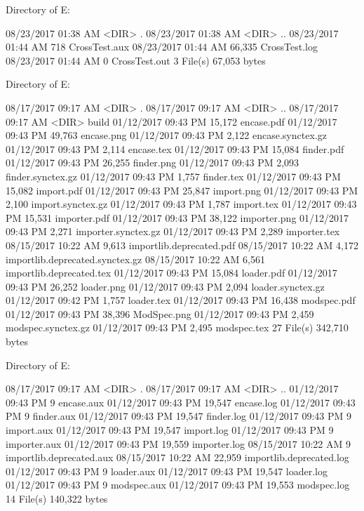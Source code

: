  Directory of E:\Python\apeman\docs\figures\build

08/23/2017  01:38 AM    <DIR>          .
08/23/2017  01:38 AM    <DIR>          ..
08/23/2017  01:44 AM               718 CrossTest.aux
08/23/2017  01:44 AM            66,335 CrossTest.log
08/23/2017  01:44 AM                 0 CrossTest.out
               3 File(s)         67,053 bytes

 Directory of E:\Python\apeman\docs\figures\structure

08/17/2017  09:17 AM    <DIR>          .
08/17/2017  09:17 AM    <DIR>          ..
08/17/2017  09:17 AM    <DIR>          build
01/12/2017  09:43 PM            15,172 encase.pdf
01/12/2017  09:43 PM            49,763 encase.png
01/12/2017  09:43 PM             2,122 encase.synctex.gz
01/12/2017  09:43 PM             2,114 encase.tex
01/12/2017  09:43 PM            15,084 finder.pdf
01/12/2017  09:43 PM            26,255 finder.png
01/12/2017  09:43 PM             2,093 finder.synctex.gz
01/12/2017  09:43 PM             1,757 finder.tex
01/12/2017  09:43 PM            15,082 import.pdf
01/12/2017  09:43 PM            25,847 import.png
01/12/2017  09:43 PM             2,100 import.synctex.gz
01/12/2017  09:43 PM             1,787 import.tex
01/12/2017  09:43 PM            15,531 importer.pdf
01/12/2017  09:43 PM            38,122 importer.png
01/12/2017  09:43 PM             2,271 importer.synctex.gz
01/12/2017  09:43 PM             2,289 importer.tex
08/15/2017  10:22 AM             9,613 importlib.deprecated.pdf
08/15/2017  10:22 AM             4,172 importlib.deprecated.synctex.gz
08/15/2017  10:22 AM             6,561 importlib.deprecated.tex
01/12/2017  09:43 PM            15,084 loader.pdf
01/12/2017  09:43 PM            26,252 loader.png
01/12/2017  09:43 PM             2,094 loader.synctex.gz
01/12/2017  09:42 PM             1,757 loader.tex
01/12/2017  09:43 PM            16,438 modspec.pdf
01/12/2017  09:43 PM            38,396 ModSpec.png
01/12/2017  09:43 PM             2,459 modspec.synctex.gz
01/12/2017  09:43 PM             2,495 modspec.tex
              27 File(s)        342,710 bytes

 Directory of E:\Python\apeman\docs\figures\structure\build

08/17/2017  09:17 AM    <DIR>          .
08/17/2017  09:17 AM    <DIR>          ..
01/12/2017  09:43 PM                 9 encase.aux
01/12/2017  09:43 PM            19,547 encase.log
01/12/2017  09:43 PM                 9 finder.aux
01/12/2017  09:43 PM            19,547 finder.log
01/12/2017  09:43 PM                 9 import.aux
01/12/2017  09:43 PM            19,547 import.log
01/12/2017  09:43 PM                 9 importer.aux
01/12/2017  09:43 PM            19,559 importer.log
08/15/2017  10:22 AM                 9 importlib.deprecated.aux
08/15/2017  10:22 AM            22,959 importlib.deprecated.log
01/12/2017  09:43 PM                 9 loader.aux
01/12/2017  09:43 PM            19,547 loader.log
01/12/2017  09:43 PM                 9 modspec.aux
01/12/2017  09:43 PM            19,553 modspec.log
              14 File(s)        140,322 bytes

